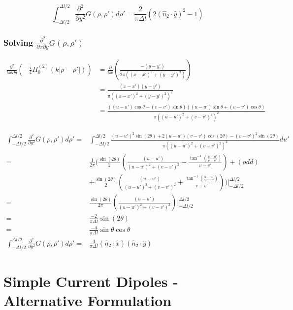 \documentclass{article}
\newcommand{\0}{\varnothing}
\begin{document}
\begin{equation}
    \int_{-\Delta l/2}^{\Delta l/2}\frac{\partial^2}{\partial y^2}G(\rho, \rho')d\rho' = \frac{2}{\pi\Delta l}\left(2(\hat{n}_2 \cdot \hat{y})^2 - 1\right)
\end{equation}



\subsubsection{Solving $\frac{\partial^2}{\partial x\partial y}G(\rho,\rho')$}

\begin{align*}
    \frac{\partial^2}{\partial x\partial y}\left(-\frac{i}{4}H_0^{(2)}(k|\rho-\rho'|)\right) &= \frac{\partial}{\partial x}\left(\frac{-(y-y')}{2\pi((x-x')^2+(y-y')^2)}\right)\\
        &= \frac{(x-x')(y-y')}{\pi((x-x')^2 + (y-y')^2)^2}\\
        &= \frac{((u-u')\cos\theta - (v-v')\sin\theta)((u-u')\sin\theta + (v-v')\cos\theta)}{\pi((u-u')^2 + (v-v')^2)^2}
\end{align*}


\begin{align*}
    \int_{-\Delta l/2}^{\Delta l/2}\frac{\partial^2}{\partial y^2}G(\rho, \rho')d\rho' =& \int_{-\Delta l/2}^{\Delta l/2}\frac{(u-u')^2\sin(2\theta) + 2(u-u')(v-v')\cos(2\theta)-(v-v')^2\sin(2\theta)}{\pi((u-u')^2 + (v-v')^2)^2}du'\\
    =& \frac{1}{2\pi}(\frac{\sin(2\theta)}{2}\left(\frac{(u-u')}{(u-u')^2+(v-v')^2} - \frac{\tan^{-1}(\frac{u-u'}{v-v'})}{v-v'}\right) + (odd)\\
    &+ \frac{\sin(2\theta)}{2}\left(\frac{(u-u')}{(u-u')^2+(v-v')^2} + \frac{\tan^{-1}(\frac{u-u'}{v-v'})}{v-v'}\right))|_{-\Delta l/2}^{\Delta l/2}\\
    =& \frac{\sin(2\theta)}{2\pi}\left(\frac{(u-u')}{(u-u')^2+(v-v')^2}\right)|_{-\Delta l/2}^{\Delta l/2}\\
    =& \frac{-2}{\pi\Delta l}\sin(2\theta)\\
    =& \frac{-4}{\pi\Delta l}\sin\theta\cos\theta\\
    \int_{-\Delta l/2}^{\Delta l/2}\frac{\partial^2}{\partial y^2}G(\rho, \rho')d\rho'=& \frac{4}{\pi\Delta l}(\hat{n}_2\cdot\hat{x})(\hat{n}_2\cdot\hat{y})
\end{align*}



\newpage
\section{Simple Current Dipoles - Alternative Formulation}
\end{document}
